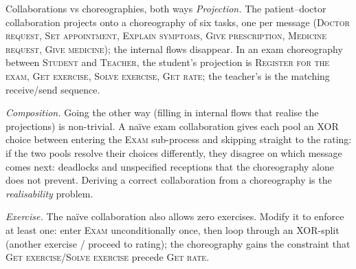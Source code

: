 \begin{examplebox}{Collaborations vs choreographies, both ways}
\emph{Projection.} The patient--doctor collaboration projects onto a choreography of six tasks, one per message (\textsc{Doctor request}, \textsc{Set appointment}, \textsc{Explain symptoms}, \textsc{Give prescription}, \textsc{Medicine request}, \textsc{Give medicine}); the internal flows disappear. In an exam choreography between \textsc{Student} and \textsc{Teacher}, the student's projection is \textsc{Register for the exam}, \textsc{Get exercise}, \textsc{Solve exercise}, \textsc{Get rate}; the teacher's is the matching receive/send sequence.
\par\smallskip
\emph{Composition.} Going the other way (filling in internal flows that realise the projections) is non-trivial. A na\"ive exam collaboration gives each pool an XOR choice between entering the \textsc{Exam} sub-process and skipping straight to the rating: if the two pools resolve their choices differently, they disagree on which message comes next: deadlocks and unspecified receptions that the choreography alone does not prevent. Deriving a correct collaboration from a choreography is the \emph{realisability} problem.
\par\smallskip
\emph{Exercise.} The na\"ive collaboration also allows zero exercises. Modify it to enforce at least one: enter \textsc{Exam} unconditionally once, then loop through an XOR-split (another exercise / proceed to rating); the choreography gains the constraint that \textsc{Get exercise}/\textsc{Solve exercise} precede \textsc{Get rate}.
\end{examplebox}
